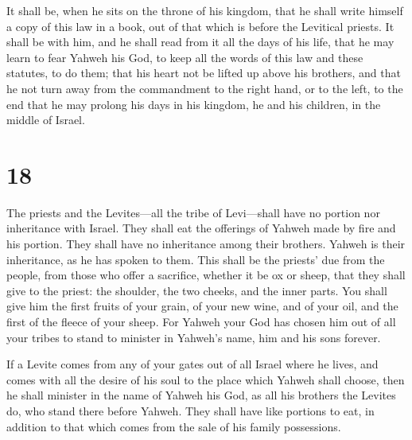  It shall be, when he sits on the throne of his kingdom,
that he shall write himself a copy of this law in a book, out of that
which is before the Levitical priests.  It shall be with
him, and he shall read from it all the days of his life, that he may
learn to fear Yahweh his God, to keep all the words of this law and
these statutes, to do them;  that his heart not be lifted
up above his brothers, and that he not turn away from the commandment to
the right hand, or to the left, to the end that he may prolong his days
in his kingdom, he and his children, in the middle of Israel.

\hypertarget{section-17}{%
\section{18}\label{section-17}}

 The priests and the Levites---all the tribe of
Levi---shall have no portion nor inheritance with Israel. They shall eat
the offerings of Yahweh made by fire and his portion. 
They shall have no inheritance among their brothers. Yahweh is their
inheritance, as he has spoken to them.  This shall be the
priests' due from the people, from those who offer a sacrifice, whether
it be ox or sheep, that they shall give to the priest: the shoulder, the
two cheeks, and the inner parts.  You shall give him the
first fruits of your grain, of your new wine, and of your oil, and the
first of the fleece of your sheep.  For Yahweh your God
has chosen him out of all your tribes to stand to minister in Yahweh's
name, him and his sons forever.

 If a Levite comes from any of your gates out of all
Israel where he lives, and comes with all the desire of his soul to the
place which Yahweh shall choose,  then he shall minister
in the name of Yahweh his God, as all his brothers the Levites do, who
stand there before Yahweh.  They shall have like portions
to eat, in addition to that which comes from the sale of his family
possessions.


